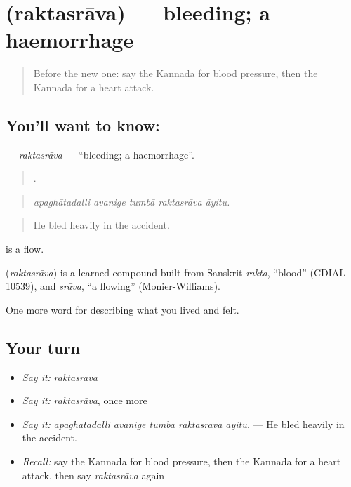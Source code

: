 \section[\texorpdfstring{\kn{ರಕ್ತಸ್ರಾವ} (raktasrāva)}{ರಕ್ತಸ್ರಾವ (raktasrāva)}]{ (raktasrāva) — bleeding; a haemorrhage}

\label{lesson:KA-C512-raktasrava}



\begin{quote}
Before the new one: say the Kannada for blood pressure, then the Kannada for a heart attack.
\end{quote}

\subsection*{You'll want to know: }
\textbf{} — \emph{raktasrāva} — \textquotedblleft{}bleeding; a haemorrhage\textquotedblright{}.

\begin{quote}
    .
\end{quote}

\begin{quote}
\emph{apaghātadalli avanige tumbā raktasrāva āyitu.}
\end{quote}

\begin{quote}
He bled heavily in the accident.
\end{quote}

 is a flow.

\begin{cousinweb}
\textbf{} (\emph{raktasrāva}) is a learned compound built from Sanskrit \emph{rakta}, \textquotedblleft{}blood\textquotedblright{} (CDIAL 10539), and \emph{srāva}, \textquotedblleft{}a flowing\textquotedblright{} (Monier-Williams).
\end{cousinweb}

\begin{grammarlens}[title={What you've built}]
One more word for describing what you lived and felt.
\end{grammarlens}

\subsection*{Your turn}
\begin{itemize}
\raggedright
  \item \emph{Say it:} \emph{raktasrāva}
  \item \emph{Say it:} \emph{raktasrāva}, once more
  \item \emph{Say it:} \emph{apaghātadalli avanige tumbā raktasrāva āyitu.} — He bled heavily in the accident.
  \item \emph{Recall:} say the Kannada for blood pressure, then the Kannada for a heart attack, then say \emph{raktasrāva} again
\end{itemize}

